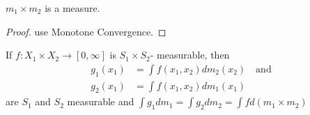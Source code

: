 \begin{theorem}
	$m_1 \times m_2$ is a measure.
\end{theorem}

\begin{proof}
	use Monotone Convergence.
\end{proof}

\begin{theorem}[Fubini]
	If $f:X_1 \times X_2 \to [0, \infty]$ is  $S_1 \times S_2$- measurable, then
	\begin{align*}
		g_1 (x_1) &= \int f(x_1, x_2) dm_2(x_2) \quad \text{and} \\
		g_2 (x_1) &= \int f(x_1, x_2) dm_1(x_1)
	\end{align*} 
	are $S_1$ and $S_2$ measurable and $\int g_1 dm_1 = \int g_2 dm_2 = \int f d(m_1 \times m_2)$
\end{theorem}

